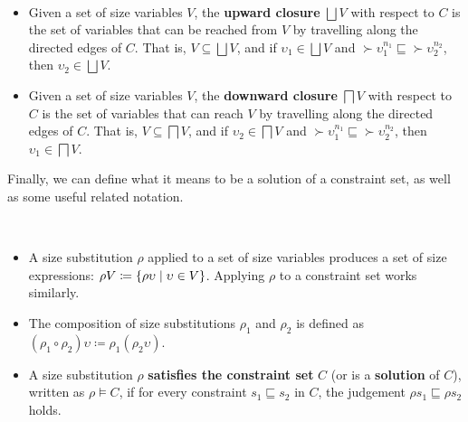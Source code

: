 \begin{definition}~\\[-4ex]
\begin{itemize}
  \item Given a set of size variables $V$, the \textbf{upward closure} $\bigsqcup V$ with respect to $C$ is the set of variables that can be reached from $V$ by travelling along the directed edges of $C$.
  That is, $V \subseteq \bigsqcup V$, and if $\upsilon_1 \in \bigsqcup V$ and $\succ{\upsilon}_1^{n_1} \sqsubseteq \succ{\upsilon}_2^{n_2}$, then $\upsilon_2 \in \bigsqcup V$.
  \item Given a set of size variables $V$, the \textbf{downward closure} $\bigsqcap V$ with respect to $C$ is the set of variables that can reach $V$ by travelling along the directed edges of $C$.
  That is, $V \subseteq \bigsqcap V$, and if $\upsilon_2 \in \bigsqcap V$ and $\succ{\upsilon}_1^{n_1} \sqsubseteq \succ{\upsilon}_2^{n_2}$, then $\upsilon_1 \in \bigsqcap V$.
\end{itemize}
\end{definition}

Finally, we can define what it means to be a solution of a constraint set,
as well as some useful related notation.

\begin{definition}~\\[-4ex]
\begin{itemize}
  \item A size substitution $\rho$ applied to a set of size variables produces a set of size expressions:
  $\rho V \coloneqq \{\rho \upsilon \mid \upsilon \in V\}$.
  Applying $\rho$ to a constraint set works similarly.

  \item The composition of size substitutions $\rho_1$ and $\rho_2$ is defined as \mbox{$(\rho_1 \circ \rho_2) \upsilon \coloneqq \rho_1(\rho_2 \upsilon)$}.

  \item A size substitution $\rho$ \textbf{satisfies the constraint set} $C$ (or is a \textbf{solution} of $C$), written as $\rho \vDash C$, if for every constraint $s_1 \sqsubseteq s_2$ in $C$, the judgement $\rho s_1 \sqsubseteq \rho s_2$ holds.
\end{itemize}
\end{definition}



